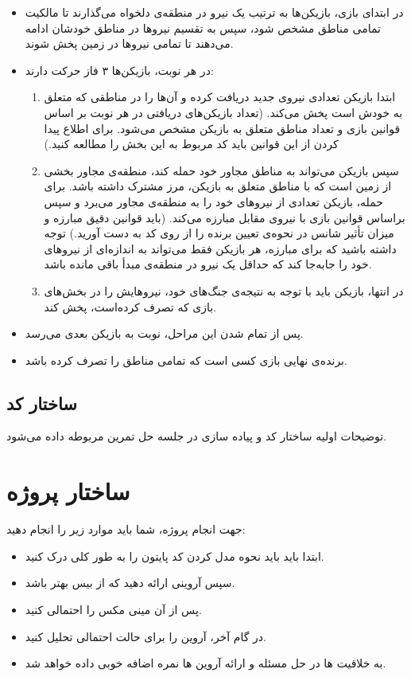 \documentclass{article}
\begin{document}
\begin{large}
    \begin{itemize}
        \item در ابتدای بازی، بازیکن‌ها به ترتیب یک نیرو در منطقه‌ی دلخواه می‌گذارند تا مالکیت تمامی مناطق مشخص شود، سپس به تقسیم نیروها در مناطق خودشان ادامه می‌دهند تا تمامی نیروها در زمین پخش شوند.
        \item در هر نوبت، بازیکن‌ها ۳ فاز حرکت دارند:
        \begin{enumerate}
            \item ابتدا بازیکن تعدادی نیروی جدید دریافت کرده و آن‌ها را در مناطقی که متعلق به خودش است پخش می‌کند. (تعداد بازیکن‌های دریافتی در هر نوبت بر اساس قوانین بازی و تعداد مناطق متعلق به بازیکن مشخص می‌شود. برای اطلاع پیدا کردن از این قوانین باید کد مربوط به این بخش را مطالعه کنید.)
            \item سپس بازیکن می‌تواند به مناطق مجاور خود حمله کند، منطقه‌ی مجاور بخشی از زمین است که با مناطق متعلق به بازیکن، مرز مشترک داشته باشد. برای حمله، بازیکن تعدادی از نیروهای خود را به منطقه‌ی مجاور می‌برد و سپس براساس قوانین بازی با نیروی مقابل مبارزه می‌کند. (باید قوانین دقیق مبارزه و میزان تأثیر شانس در نحوه‌ی تعیین برنده را از روی کد به دست آورید.) توجه داشته باشید که برای مبارزه، هر بازیکن فقط می‌تواند به اندازه‌ای از نیروهای خود را جابه‌جا کند که حداقل یک نیرو در منطقه‌ی مبدأ باقی مانده باشد.
            \item در انتها، بازیکن باید با توجه به نتیجه‌ی جنگ‌های خود، نیروهایش را در بخش‌های بازی که تصرف کرده‌است، پخش کند.
        \end{enumerate}
        \item پس از تمام شدن این مراحل، نوبت به بازیکن بعدی می‌رسد.
        \item برنده‌ی نهایی بازی کسی است که تمامی مناطق را تصرف کرده باشد.
    \end{itemize}
    \subsection{ساختار کد}
    توضیحات اولیه ساختار کد و پیاده سازی در جلسه حل تمرین مربوطه داده می‌شود.
    
    \section{ساختار پروژه}
    جهت انجام پروژه، شما باید موارد زیر را انجام دهید:
    \begin{itemize}
        \item ابتدا باید باید نحوه مدل کردن کد پایتون را به طور کلی درک کنید.
        \item سپس  آروینی ارائه دهید که از بیس بهتر باشد.
        \item پس از آن مینی مکس را احتمالی کنید.
        \item در گام آخر، آروین را برای حالت احتمالی تحلیل کنید.
        \item به خلاقیت ها در حل مسئله و ارائه آروین ها نمره اضافه خوبی داده خواهد شد.
        

\end{itemize}
\end{large}
\end{document}

